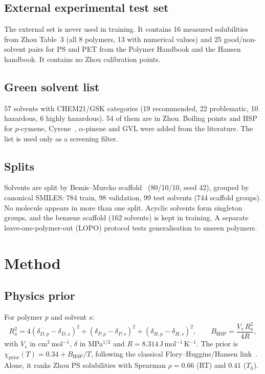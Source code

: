 \documentclass[11pt,a4paper]{article}
\begin{document}
\subsection{External experimental test set}
The external set is never used in training. It contains 16 measured solubilities from Zhou Table~3 (all
8 polymers, 13 with numerical values) and 25 good/non-solvent pairs for PS and PET from the Polymer
Handbook and the Hansen handbook. It contains no Zhou calibration points.

\subsection{Green solvent list}
57 solvents with CHEM21/GSK categories (19 recommended, 22 problematic, 10 hazardous, 6 highly
hazardous). 54 of them are in Zhou. Boiling points and HSP for $p$-cymene, Cyrene~\cite{cyrene},
$\alpha$-pinene and GVL were added from the literature. The list is used only as a screening filter.

\subsection{Splits}
Solvents are split by Bemis--Murcko scaffold~\cite{bemis} (80/10/10, seed 42), grouped by canonical
SMILES: 784 train, 98 validation, 99 test solvents (744 scaffold groups). No molecule appears in more
than one split. Acyclic solvents form singleton groups, and the benzene scaffold (162 solvents) is kept in
training. A separate leave-one-polymer-out (LOPO) protocol tests generalisation to unseen polymers.

\section{Method}
\subsection{Physics prior}
For polymer $p$ and solvent $s$:
\begin{equation}
R_a^2 = 4(\delta_{D,p}-\delta_{D,s})^2 + (\delta_{P,p}-\delta_{P,s})^2 + (\delta_{H,p}-\delta_{H,s})^2,
\qquad
B_{\mathrm{HSP}} = \frac{V_s\,R_a^2}{4R},
\end{equation}
with $V_s$ in cm$^3$\,mol$^{-1}$, $\delta$ in MPa$^{1/2}$ and $R = 8.314$\,J\,mol$^{-1}$\,K$^{-1}$. The
prior is $\chi_{\text{prior}}(T)=0.34+B_{\mathrm{HSP}}/T$, following the classical Flory--Huggins/Hansen
link~\cite{flory,hansen}. Alone, it ranks Zhou PS solubilities with Spearman $\rho=0.66$ (RT) and
$0.41$ ($T_h$).
\end{document}
